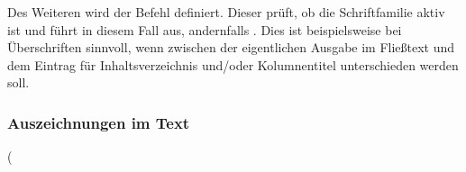 \documentclass[%
  english,ngerman,%
  headings=optiontoheadandtoc,captions=tableheading,numbers=noenddot,%
  chapterpage,cdfoot,%
]{tudscrman}
\newlength{\tempdim}
\begin{document}
\begin{Declaration}{}%
\printdeclarationlist%
Des Weiteren wird der Befehl  definiert. Dieser prüft, ob die 
Schriftfamilie \DIN aktiv ist und führt in diesem Fall  
aus, andernfalls . Dies ist beispielsweise bei 
Überschriften sinnvoll, wenn zwischen der eigentlichen Ausgabe im Fließtext und 
dem Eintrag für Inhaltsverzeichnis und/oder Kolumnentitel unterschieden werden 
soll.
\end{Declaration}

\subsubsection{Auszeichnungen im Text}
\begin{Declaration}{}
\begin{Declaration}{}
\begin{Declaration}{}
\begin{Declaration}{}
\begin{Declaration}{}
\begin{Declaration}{}
\begin{Declaration}{}
\begin{Declaration}{}
\begin{Declaration}{}
\begin{Declaration}{}
\begin{Declaration}{}
\begin{Declaration}{}
\begin{Declaration}{}
\begin{Declaration}{}
\begin{Declaration}{}
\begin{Declaration}{}
\begin{Declaration}{}
\begin{Declaration}{}
%
\addtolength{\tempdim}{\dimexpr 2\tabcolsep+2\arrayrulewidth-\textwidth}%
\printdeclarationlist(%
  \begin{minipage}{-\tempdim}%
  \centering%
  \begin{tabularm}{3}%

\end{tabularm}
\end{minipage}
\end{Declaration}
\end{Declaration}
\end{Declaration}
\end{Declaration}
\end{Declaration}
\end{Declaration}
\end{Declaration}
\end{Declaration}
\end{Declaration}
\end{Declaration}
\end{Declaration}
\end{Declaration}
\end{Declaration}
\end{Declaration}
\end{Declaration}
\end{Declaration}
\end{Declaration}
\end{Declaration}
\end{document}

